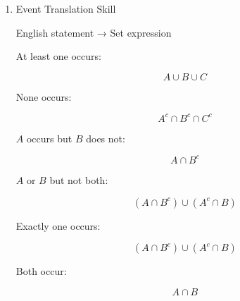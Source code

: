 \documentclass[11pt]{article}
\begin{document}
\begin{enumerate}
A major skill in probability is choosing a useful sample space.

Example:

Detailed representation:

\[
\{BBB,BBG,BGB,GBB,BGG,GBG,GGB,GGG\}
\]

Compressed representation:

\[
\{0\text{ girls},1\text{ girl},2\text{ girls},3\text{ girls}\}
\]

Different representations may lead to different probabilities for sample points.
\item Event Translation Skill
\label{sec:orgfce92c5}

English statement → Set expression

At least one occurs:

\[
A\cup B\cup C
\]

None occurs:

\[
A^c\cap B^c\cap C^c
\]

\(A\) occurs but \(B\) does not:

\[
A\cap B^c
\]

\(A\) or \(B\) but not both:

\[
(A\cap B^c)
\cup
(A^c\cap B)
\]

Exactly one occurs:

\[
(A\cap B^c)
\cup
(A^c\cap B)
\]

Both occur:

\[
A\cap B
\]
\end{enumerate}
\end{document}
